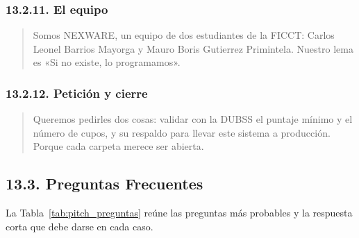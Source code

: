 
\subsubsection{13.2.11. El equipo}

\begin{quote}
Somos NEXWARE, un equipo de dos estudiantes de la FICCT: Carlos Leonel Barrios Mayorga y Mauro Boris Gutierrez Primintela. Nuestro lema es «Si no existe, lo programamos».
\end{quote}

\subsubsection{13.2.12. Petición y cierre}

\begin{quote}
Queremos pedirles dos cosas: validar con la DUBSS el puntaje mínimo y el número de cupos, y su respaldo para llevar este sistema a producción. Porque cada carpeta merece ser abierta.
\end{quote}

\subsection{13.3. Preguntas Frecuentes}

La Tabla~\ref{tab:pitch_preguntas} reúne las preguntas más probables y la respuesta corta que debe darse en cada caso.

